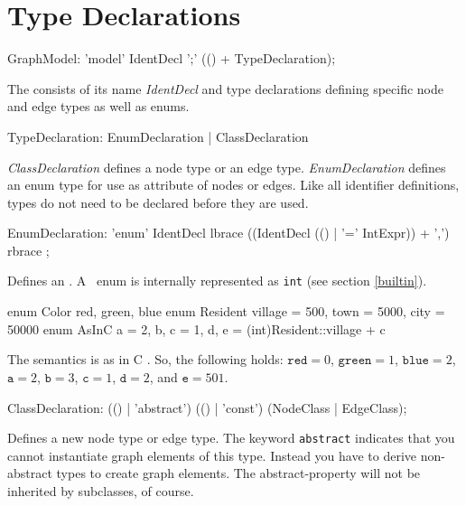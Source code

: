\section{Type Declarations}
\begin{rail}
  GraphModel: 'model' IdentDecl ';' (() + TypeDeclaration);
\end{rail}
The  consists of its name \emph{IdentDecl} and type declarations defining specific node and edge types as well as enums.

\begin{rail}
  TypeDeclaration: EnumDeclaration | ClassDeclaration
\end{rail}
\emph{ClassDeclaration} defines a node type or an edge type. \emph{EnumDeclaration} defines an enum type for use as attribute of nodes or edges. Like all identifier definitions, types do not need to be declared before they are used.

\begin{rail}
  EnumDeclaration: 'enum' IdentDecl lbrace ((IdentDecl (() | '=' IntExpr)) + ',') rbrace ;
\end{rail}
Defines an .
A \GrG\ enum is internally represented as \texttt{int} (see section \ref{builtin}).

\begin{example}
\begin{grgen}
enum Color {red, green, blue}
enum Resident {village = 500, town = 5000, city = 50000}
enum AsInC {a = 2, b, c = 1, d, e = (int)Resident::village + c}
\end{grgen}
The semantics is as in C \cite{Sch:1990:ANSIC}. So, the following holds: $\texttt{red} = 0$, $\texttt{green} = 1$, $\texttt{blue} = 2$, $\texttt{a}=2$, $\texttt{b}=3$, $\texttt{c}=1$, $\texttt{d}=2$, and $\texttt{e}=501$.
\end{example}

\begin{rail}  
  ClassDeclaration: (() | 'abstract') (() | 'const') (NodeClass | EdgeClass);
\end{rail}
Defines a new node type or edge type. The keyword \texttt{abstract} indicates that you cannot instantiate graph elements of this type. Instead you have to derive non-abstract types to create graph elements. The abstract-property will not be inherited by subclasses, of course.

